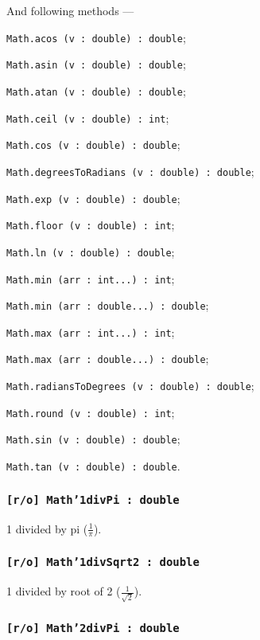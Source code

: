 And following methods —
\begin{icItems}
	\item \texttt{Math.acos (v : double) : double};
	\item \texttt{Math.asin (v : double) : double};
	\item \texttt{Math.atan (v : double) : double};
	\item \texttt{Math.ceil (v : double) : int};
	\item \texttt{Math.cos (v : double) : double};
	\item \texttt{Math.degreesToRadians (v : double) : double};
	\item \texttt{Math.exp (v : double) : double};
	\item \texttt{Math.floor (v : double) : int};
	\item \texttt{Math.ln (v : double) : double};
	\item \texttt{Math.min (arr : int...) : int};
	\item \texttt{Math.min (arr : double...) : double};
	\item \texttt{Math.max (arr : int...) : int};
	\item \texttt{Math.max (arr : double...) : double};
	\item \texttt{Math.radiansToDegrees (v : double) : double};
	\item \texttt{Math.round (v : double) : int};
	\item \texttt{Math.sin (v : double) : double};
	\item \texttt{Math.tan (v : double) : double}.
\end{icItems}

\subsubsection{\texttt{[r/o] Math'1divPi : double}}

1 divided by pi ($\frac{1}{\pi}$).

\subsubsection{\texttt{[r/o] Math'1divSqrt2 : double}}

1 divided by root of 2 ($\frac{1}{\sqrt{2}}$).

\subsubsection{\texttt{[r/o] Math'2divPi : double}}

